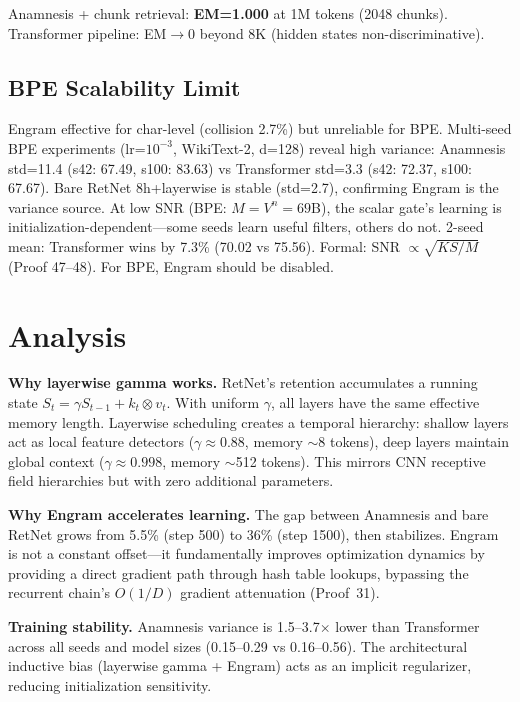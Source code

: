 \documentclass[twocolumn]{article}
\begin{document}
Anamnesis + chunk retrieval: \textbf{EM=1.000} at 1M tokens (2048 chunks).
Transformer pipeline: EM$\rightarrow$0 beyond 8K (hidden states non-discriminative).

\subsection{BPE Scalability Limit}

Engram effective for char-level (collision 2.7\%) but unreliable for BPE.
Multi-seed BPE experiments (lr=$10^{-3}$, WikiText-2, d=128) reveal high variance:
Anamnesis std=11.4 (s42: 67.49, s100: 83.63) vs Transformer std=3.3 (s42: 72.37, s100: 67.67).
Bare RetNet 8h+layerwise is stable (std=2.7), confirming Engram is the variance source.
At low SNR (BPE: $M = V^n = 69$B), the scalar gate's learning is initialization-dependent---some
seeds learn useful filters, others do not. 2-seed mean: Transformer wins by 7.3\% (70.02 vs 75.56).
Formal: SNR $\propto \sqrt{KS/M}$ (Proof 47--48). For BPE, Engram should be disabled.

\section{Analysis}

\textbf{Why layerwise gamma works.} RetNet's retention accumulates a running state $S_t = \gamma S_{t-1} + k_t \otimes v_t$. With uniform $\gamma$, all layers have the same effective memory length. Layerwise scheduling creates a temporal hierarchy: shallow layers act as local feature detectors ($\gamma \approx 0.88$, memory $\sim$8 tokens), deep layers maintain global context ($\gamma \approx 0.998$, memory $\sim$512 tokens). This mirrors CNN receptive field hierarchies but with zero additional parameters.

\textbf{Why Engram accelerates learning.} The gap between Anamnesis and bare RetNet grows from 5.5\% (step 500) to 36\% (step 1500), then stabilizes. Engram is not a constant offset---it fundamentally improves optimization dynamics by providing a direct gradient path through hash table lookups, bypassing the recurrent chain's $O(1/D)$ gradient attenuation (Proof~31).

\textbf{Training stability.} Anamnesis variance is 1.5--3.7$\times$ lower than Transformer across all seeds and model sizes (0.15--0.29 vs 0.16--0.56). The architectural inductive bias (layerwise gamma + Engram) acts as an implicit regularizer, reducing initialization sensitivity.
\end{document}
